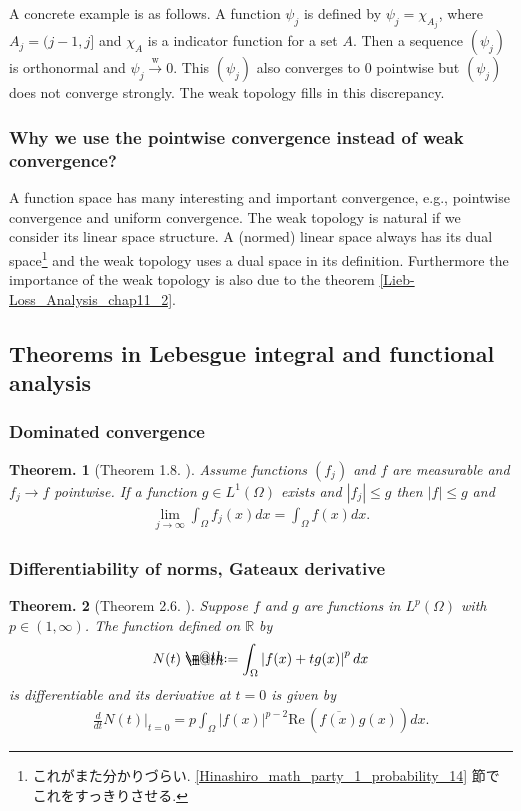 \documentclass[openany, a4paper, oneside]{jsbook}
\makeatletter
\newcommand*{\defeq}{\mathrel{\rlap{%
\raisebox{0.3ex}{$\m@th\cdot$}}%
\raisebox{-0.3ex}{$\m@th\cdot$}}%
=}
\theoremstyle{break}
\theoremstyle{breakdefn}
\newtheorem{thm}{Theorem.}[section]
\renewcommand{\Re}{\mathrm{Re} \,}
\newcommand{\abs}[1]{\left|#1\right|}
\newcommand{\rbk}[1]{\left (#1\right)}
\newcommand{\bbR}{\mathbb{R}}
\newcommand{\wto}{\xrightarrow{\text{w}}}
\makeatother
\begin{document}
A concrete example is as follows.
A function $\psi_j$ is defined by $\psi_j = \chi_{A_j}$, where $A_j = (j-1, j]$ and $\chi_A$ is a indicator function for a set $A$.
Then a sequence $(\psi_j)$ is orthonormal and $\psi_j \wto 0$.
This $(\psi_j)$ also converges to $0$ pointwise but $(\psi_j)$ does not converge strongly.
The weak topology fills in this discrepancy.
\subsubsection{Why we use the pointwise convergence instead of weak convergence?}


A function space has many interesting and important convergence, e.g., pointwise convergence and uniform convergence.
The weak topology is natural if we consider its linear space structure.
A (normed) linear space always has its dual space\footnote{これがまた分かりづらい. \ref{Hinashiro_math_party_1_probability_14} 節でこれをすっきりさせる.
 } and the weak topology uses a dual space in its definition.
Furthermore the importance of the weak topology is also due to the theorem \ref{Lieb-Loss_Analysis_chap11_2}.
\subsection{Theorems in Lebesgue integral and functional analysis}

\subsubsection{Dominated convergence}


\begin{thm}[Theorem 1.8. \cite{LiebLoss1}]\label{Lieb-Loss_Analysis_chap11_6}
 Assume functions $(f_j)$ and $f$ are measurable and $f_j \to f$ pointwise.
 If a function $g \in L^1 (\Omega)$ exists and $\abs{f_j} \leq g$ then $\abs{f} \leq g$ and
 \begin{align}
  \lim_{j \to \infty} \int_{\Omega} f_j (x) dx
  =
  \int_{\Omega} f (x) dx.
 \end{align}
\end{thm}
\subsubsection{Differentiability of norms, Gateaux derivative}


\begin{thm}[Theorem 2.6. \cite{LiebLoss1}]\label{Lieb-Loss_Analysis_chap11_26}
 Suppose $f$ and $g$ are functions in $L^p (\Omega)$ with $p \in \rbk{1, \infty}$.
 The function defined on $\bbR$ by
 \begin{align}
  N (t)
  \defeq
  \int_{\Omega} \abs{f (x) + t g (x)}^{p} dx
 \end{align}
 is differentiable and its derivative at $t = 0$ is given by
 \begin{align}
  \frac{d}{dt} N (t) \Big |_{t=0}
  =
  p \int_{\Omega} \abs{f (x)}^{p-2} \Re \rbk{\overline{f (x)} g (x)} dx.
 \end{align}
\end{thm}
\end{document}

